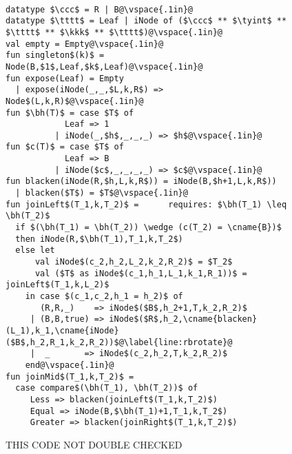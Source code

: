 \begin{figure}
\begin{datastructure}~
\label{ds:redblack}
\begin{lstlisting}
datatype $\ccc$ = R | B@\vspace{.1in}@
datatype $\tttt$ = Leaf | iNode of ($\ccc$ ** $\tyint$ ** $\tttt$ ** $\kkk$ ** $\tttt$)@\vspace{.1in}@
val empty = Empty@\vspace{.1in}@
fun singleton$(k)$ = Node(B,$1$,Leaf,$k$,Leaf)@\vspace{.1in}@
fun expose(Leaf) = Empty
  | expose(iNode(_,_,$L,k,R$) => Node$(L,k,R)$@\vspace{.1in}@
fun $\bh(T)$ = case $T$ of 
            Leaf => 1
          | iNode(_,$h$,_,_,_) => $h$@\vspace{.1in}@
fun $c(T)$ = case $T$ of 
            Leaf => B
          | iNode($c$,_,_,_,_) => $c$@\vspace{.1in}@
fun blacken(iNode(R,$h,L,k,R$)) = iNode(B,$h+1,L,k,R$))
  | blacken($T$) = $T$@\vspace{.1in}@
fun joinLeft$(T_1,k,T_2)$ =      requires: $\bh(T_1) \leq \bh(T_2)$
  if $(\bh(T_1) = \bh(T_2)) \wedge (c(T_2) = \cname{B})$
  then iNode(R,$\bh(T_1),T_1,k,T_2$)
  else let 
      val iNode$(c_2,h_2,L_2,k_2,R_2)$ = $T_2$
      val ($T$ as iNode$(c_1,h_1,L_1,k_1,R_1))$ = joinLeft$(T_1,k,L_2)$
    in case $(c_1,c_2,h_1 = h_2)$ of
       (R,R,_)    => iNode$($B$,h_2+1,T,k_2,R_2)$
     | (B,B,true) => iNode$($R$,h_2,\cname{blacken}(L_1),k_1,\cname{iNode}($B$,h_2,R_1,k_2,R_2))$@\label{line:rbrotate}@
     |  _       => iNode$(c_2,h_2,T,k_2,R_2)$
    end@\vspace{.1in}@
fun joinMid$(T_1,k,T_2)$ =
  case compare$(\bh(T_1), \bh(T_2))$ of
     Less => blacken(joinLeft$(T_1,k,T_2)$)
     Equal => iNode(B,$\bh(T_1)+1,T_1,k,T_2$)
     Greater => blacken(joinRight$(T_1,k,T_2)$)
\end{lstlisting}
THIS CODE NOT DOUBLE CHECKED
\end{datastructure}
\end{figure}

\begin{comment}
Another version of joinLeft---much longer
\begin{lstlisting}
fun joinLeft$(T_1,k,T_2)$ =      requires: $h(T_1) \leq h(T_2)$
  if $h(T_1) = h(T_2)$
  then Node(R,$h(T_1),T_1,k,T_2$)
  else let 
      val Node$(c_2,h_2,L_2,k_2,R_2)$ = $T_2$
       in case $c(L_2)$ of
         R => (case joinLeftR$(T_1,k,L_2)$ of
                 Node(B,$h_1,L_1,k_1,R_1)$ =>
                   Node$($R$,h_2,\cname{blacken}(L_1),k_1,\cname{Node}($B$,h_2,R_1,k_2,R_2))$@\label{line:rbrotate}@
               | $T$ => Node$($B$,h_2,T,k_2,R_2)$)
        | B => NODE(B,$h_2,\cname{joinLeft}(T_1,k,L_2),k_2,R_2$)
and joinLeftR$(T_1,k,T_2)$ =
  let val Node$(c_2,h_2,L_2,k_2,R_2)$ = $T_2$
  in let val $T$ = joinLeft$(T_1,k,L_2)$
     in case $c(T)$ of
       R => Node$($B$,h_2+1,T,k_2,R_2)$
     | B => Node$($R$,h_2,T,k_2,R_2)$@\vspace{.1in}@
\end{lstlisting}
\end{comment}

